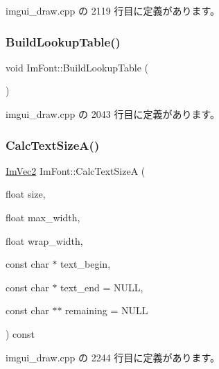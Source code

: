  imgui\+\_\+draw.\+cpp の 2119 行目に定義があります。

\mbox{\label{struct_im_font_a04b3a1437bd0032722bbbd3613941162}} 
\subsubsection{\texorpdfstring{Build\+Lookup\+Table()}{BuildLookupTable()}}
{\footnotesize\ttfamily void Im\+Font\+::\+Build\+Lookup\+Table (\begin{DoxyParamCaption}{ }\end{DoxyParamCaption})}



 imgui\+\_\+draw.\+cpp の 2043 行目に定義があります。

\mbox{\label{struct_im_font_ad67f64fd206ad197f4b93b1a1ae27cfe}} 
\subsubsection{\texorpdfstring{Calc\+Text\+Size\+A()}{CalcTextSizeA()}}
{\footnotesize\ttfamily \mbox{\hyperlink{struct_im_vec2}{Im\+Vec2}} Im\+Font\+::\+Calc\+Text\+SizeA (\begin{DoxyParamCaption}\item[{float}]{size,  }\item[{float}]{max\+\_\+width,  }\item[{float}]{wrap\+\_\+width,  }\item[{const char $\ast$}]{text\+\_\+begin,  }\item[{const char $\ast$}]{text\+\_\+end = {\ttfamily NULL},  }\item[{const char $\ast$$\ast$}]{remaining = {\ttfamily NULL} }\end{DoxyParamCaption}) const}



 imgui\+\_\+draw.\+cpp の 2244 行目に定義があります。

\mbox{\label{struct_im_font_a3781bb82a1ceba919cb6c98a398c7a67}} 
